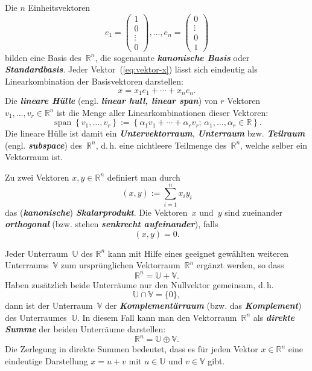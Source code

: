 \documentclass[a4paper,twoside,english,ngerman,deutsch,german,sectrefs,envcountsame,envcountchap]{svmono}
\begin{document}
Die $n$ Einheitsvektoren
\[
e_{1}=\left(\begin{array}{c} 1\\ 0\\
\vdots\\
0
\end{array}\right),\ldots,e_{n}=\left(\begin{array}{c}
0\\
\vdots\\
0\\ 1
\end{array}\right)
\]
bilden eine Basis des~${\mathbb{R}}^{n}$, die sogenannte \textbf{\em kanonische Basis} oder \textbf{\em Standardbasis}. Jeder Vektor~(\ref{eq:vektor-x}) lässt sich eindeutig als Linearkombination der Basisvektoren darstellen:
\[
x=x_{1}e_{1}+\cdots+x_{n}e_{n}.
\]
Die \textbf{\em lineare Hülle} (engl. \textbf{\em linear hull, linear span}) von $r$ Vektoren $v_{1},\ldots,v_{r}\in{\mathbb{R}}^{n}$ ist die Menge aller Linearkombinationen dieser Vektoren:
\[
{\operatorname{span}}\left\{ v_{1},\ldots,v_{r}\right\} :=\left\{ \alpha_{1}v_{1}+\cdots+\alpha_{r}v_{r};\,\alpha_{1},\ldots,\alpha_{r}\in{\mathbb{R}}\right\} .
\]
Die lineare Hülle ist damit ein \textbf{\em Untervektorraum}, \textbf{\em Unterraum} bzw. \textbf{\em Teilraum} (engl. \textbf{\em subspace}) des~${\mathbb{R}}^{n}$, d.\,h. eine nichtleere Teilmenge des~${\mathbb{R}}^{n}$, welche selber ein Vektorraum ist.

Zu zwei Vektoren $x,y\in{\mathbb{R}}^{n}$ definiert man durch
\begin{equation}
(x,y):=\sum_{i=1}^{n}x_{i}y_{i}\label{eq:skalarprodukt}
\end{equation}
das (\textbf{\em kanonische}) \textbf{\em Skalarprodukt}. Die Vektoren~$x$ und~$y$ sind zueinander \textbf{\em orthogonal} (bzw. stehen \textbf{\em senkrecht aufeinander}), falls
\[
(x,y)=0.
\]

Jeder Unterraum~$\mathbb{U}$ des ${\mathbb{R}}^{n}$ kann mit Hilfe eines geeignet gewählten weiteren Unterraums~$\mathbb{V}$ zum ursprünglichen Vektorraum~${\mathbb{R}}^{n}$ ergänzt werden, so dass
\[
{\mathbb{R}}^{n}=\mathbb{U}+\mathbb{V}.
\]
Haben zusätzlich beide Unterräume nur den Nullvektor gemeinsam, d.\,h.
\[
\mathbb{U}\cap\mathbb{V}=\{0\},
\]
dann ist der Unterraum~$\mathbb{V}$ der \textbf{\em Komplementärraum} (bzw. das \textbf{\em Komplement}) des Unterraumes~$\mathbb{U}$. In diesem Fall kann man den Vektorraum~${\mathbb{R}}^{n}$ als \textbf{\em direkte Summe} der beiden Unterräume darstellen:
\[
{\mathbb{R}}^{n}=\mathbb{U}\oplus\mathbb{V}.
\]
Die Zerlegung in direkte Summen bedeutet, dass es für jeden Vektor $x\in{\mathbb{R}}^{n}$ eine eindeutige Darstellung $x=u+v$ mit $u\in\mathbb{U}$ und $v\in\mathbb{V}$ gibt.
\end{document}
